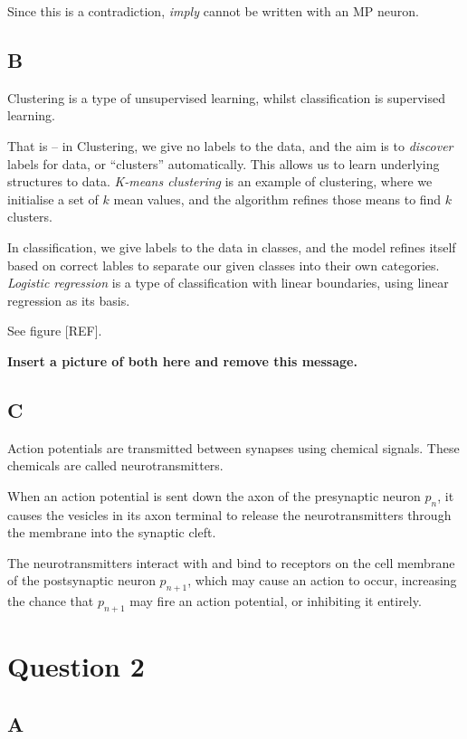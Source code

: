 \documentclass{article}
\begin{document}
Since this is a contradiction, \textit{imply} cannot be written with an MP neuron.

\subsection*{B}

Clustering is a type of unsupervised learning, whilst classification is supervised learning. 

That is -- in Clustering, we give no labels to the data, and the aim is to \textit{discover} labels for data, or ``clusters'' automatically. This allows us to learn underlying structures to data. \textit{K-means clustering} is an example of clustering, where we initialise a set of $k$ mean values, and the algorithm refines those means to find $k$ clusters.

In classification, we give labels to the data in classes, and the model refines itself based on correct lables to separate our given classes into their own categories. \textit{Logistic regression} is a type of classification with linear boundaries, using linear regression as its basis.

See figure [REF].

\textbf{Insert a picture of both here and remove this message.}

\subsection*{C}

Action potentials are transmitted between synapses using chemical signals. These chemicals are called neurotransmitters.

When an action potential is sent down the axon of the presynaptic neuron $p_n$, it causes the vesicles in its axon terminal to release the neurotransmitters through the membrane into the synaptic cleft. 

The neurotransmitters interact with and bind to receptors on the cell membrane of the postsynaptic neuron $p_{n+1}$, which may cause an action to occur, increasing the chance that $p_{n+1}$ may fire an action potential, or inhibiting it entirely.

\section*{Question 2}

\subsection*{A}
\end{document}
